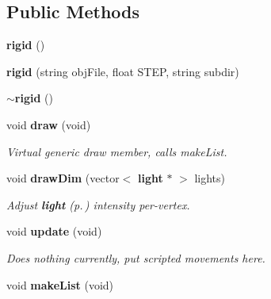 \subsection*{Public Methods}
\begin{CompactItemize}
\item 
{}
{\bf rigid} ()\label{classrigid_a0}

\item 
{}
{\bf rigid} (string obj\-File, float STEP, string subdir)\label{classrigid_a1}

\item 
{}
{\bf $\sim$rigid} ()\label{classrigid_a2}

\item 
{}
void {\bf draw} (void)\label{classrigid_a3}

\begin{CompactList}\small\item\em Virtual generic draw member, calls make\-List.\item\end{CompactList}\item 
{}
void {\bf draw\-Dim} (vector$<$ {\bf light} $\ast$ $>$ lights)\label{classrigid_a4}

\begin{CompactList}\small\item\em Adjust {\bf light} {\rm (p.\,\pageref{classlight})} intensity per-vertex.\item\end{CompactList}\item 
{}
void {\bf update} (void)\label{classrigid_a5}

\begin{CompactList}\small\item\em Does nothing currently, put scripted movements here.\item\end{CompactList}\item 
{}
void {\bf make\-List} (void)\label{classrigid_a6}


\end{CompactItemize}
